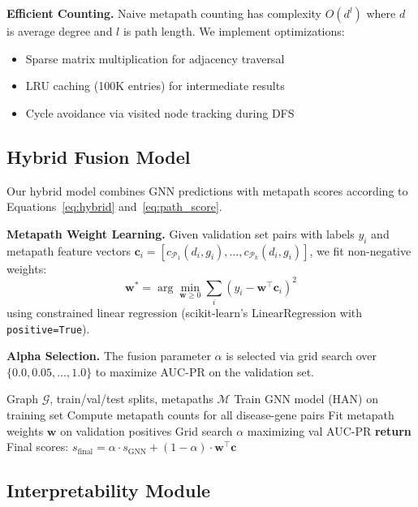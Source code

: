 \documentclass[11pt]{article}
\newcommand{\vect}[1]{\mathbf{#1}}
\newcommand{\set}[1]{\mathcal{#1}}
\begin{document}
\textbf{Efficient Counting.} Naive metapath counting has complexity $O(d^l)$ where $d$ is average degree and $l$ is path length. We implement optimizations:
\begin{itemize}
    \item Sparse matrix multiplication for adjacency traversal
    \item LRU caching (100K entries) for intermediate results
    \item Cycle avoidance via visited node tracking during DFS
\end{itemize}

\subsection{Hybrid Fusion Model}
\label{sec:hybrid}

Our hybrid model combines GNN predictions with metapath scores according to Equations~\ref{eq:hybrid} and~\ref{eq:path_score}.

\textbf{Metapath Weight Learning.} Given validation set pairs with labels $y_i$ and metapath feature vectors $\vect{c}_i = [c_{\set{P}_1}(d_i, g_i), \ldots, c_{\set{P}_k}(d_i, g_i)]$, we fit non-negative weights:
\begin{equation}
    \vect{w}^* = \arg\min_{\vect{w} \geq 0} \sum_i \left(y_i - \vect{w}^\top \vect{c}_i\right)^2
\end{equation}
using constrained linear regression (scikit-learn's LinearRegression with \texttt{positive=True}).

\textbf{Alpha Selection.} The fusion parameter $\alpha$ is selected via grid search over $\{0.0, 0.05, \ldots, 1.0\}$ to maximize AUC-PR on the validation set.

\begin{algorithm}[t]
\caption{Hybrid Model Training and Inference}
\label{alg:hybrid}
\begin{algorithmic}[1]
\REQUIRE Graph $\set{G}$, train/val/test splits, metapaths $\set{M}$
\STATE Train GNN model (HAN) on training set
\STATE Compute metapath counts for all disease-gene pairs
\STATE Fit metapath weights $\vect{w}$ on validation positives
\STATE Grid search $\alpha$ maximizing val AUC-PR
\STATE \textbf{return} Final scores: $s_{\text{final}} = \alpha \cdot s_{\text{GNN}} + (1-\alpha) \cdot \vect{w}^\top \vect{c}$
\end{algorithmic}
\end{algorithm}

\subsection{Interpretability Module}
\end{document}
